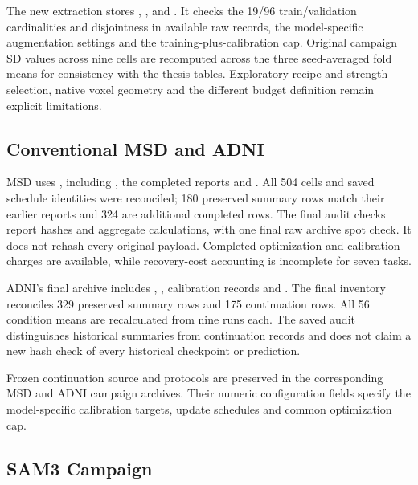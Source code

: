 The new extraction stores ,
,  and
. It checks the 19/96 train/validation cardinalities
and disjointness in available raw records, the model-specific
augmentation settings and the training-plus-calibration cap. Original
campaign SD values across nine cells are recomputed across the three
seed-averaged fold means for consistency with the thesis tables.
Exploratory recipe and strength selection, native voxel geometry and
the different budget definition remain explicit limitations.

\subsection{Conventional MSD and ADNI}

MSD uses , including
, the completed reports and
. All 504 cells and saved schedule identities
were reconciled; 180 preserved summary rows match their earlier reports
and 324 are additional completed rows. The final audit checks report
hashes and aggregate calculations, with one final raw archive spot
check. It does not rehash every original payload. Completed optimization
and calibration charges are available, while recovery-cost accounting
is incomplete for seven tasks.

ADNI's final archive includes
, , calibration records and
. The final inventory reconciles 329 preserved
summary rows and 175 continuation rows. All 56 condition means are
recalculated from nine runs each. The saved audit distinguishes
historical summaries from continuation records and does not claim a
new hash check of every historical checkpoint or prediction.

Frozen continuation source and protocols are preserved in the
corresponding MSD and ADNI campaign archives. Their numeric configuration
fields specify the model-specific calibration targets,
update schedules and common optimization cap.

\subsection{SAM3 Campaign}

